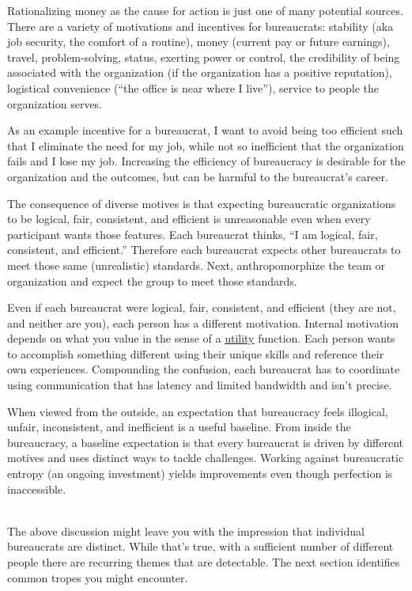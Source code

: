 Rationalizing money as the cause for action is just one of many potential sources.
There are a variety of motivations and incentives for bureaucrats: 
stability (aka job security, the comfort of a routine),
money (current pay or future earnings), 
travel, 
problem-solving, 
status, 
exerting power or control, 
the credibility of being associated with the organization (if the organization has a positive reputation), 
logistical convenience (``the office is near where I live''), 
service to people the organization serves.


As an example incentive for a bureaucrat, I want to avoid being too efficient such that I eliminate the need for my job, 
while not so inefficient that the organization fails and I lose my job. Increasing the efficiency of bureaucracy is desirable for the organization and the outcomes, but can be harmful to the bureaucrat's career.


The consequence of diverse motives is that expecting bureaucratic organizations to be logical, fair, consistent, and efficient is unreasonable even when every participant wants those features. Each bureaucrat thinks, ``I am logical, fair, consistent, and efficient.'' Therefore each bureaucrat expects other bureaucrats to meet those same (unrealistic) standards. Next, anthropomorphize the team or organization and expect the group to meet those standards. 

Even if each bureaucrat were logical, fair, consistent, and efficient (they are not, and neither are you), each person has a different motivation. Internal motivation depends on what you value in the sense of a
\href{https://en.wikipedia.org/wiki/Utility}{utility}
function.  Each person wants to accomplish something different using their unique skills and reference their own experiences. Compounding the confusion, each bureaucrat has to coordinate using communication that has latency and limited bandwidth and isn't precise.

When viewed from the outside, an expectation that bureaucracy feels illogical, unfair, inconsistent, and inefficient is a useful baseline. From inside the bureaucracy, a baseline expectation is that every bureaucrat is driven by different motives and uses distinct ways to tackle challenges. Working against bureaucratic entropy (an ongoing investment) yields improvements even though perfection is inaccessible.


\ \\


The above discussion might leave you with the impression that individual bureaucrats are distinct. While that's true, with a sufficient number of different people there are recurring themes that are detectable. The next section identifies common tropes you might encounter.